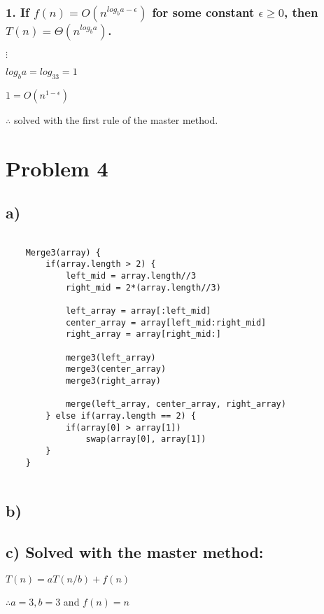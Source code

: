\documentclass{article}
\begin{document}
\subsubsection*{1. If $f(n) = O(n^{log_ba - \epsilon})$ for some constant $\epsilon \geq  0$, then $T(n) = \Theta(n^{log_ba})$.}

$\vdots$

$log_ba = log_33 = 1$

$1 = O(n^{1 - \epsilon})$

$\therefore$  solved with the first rule of the master method.

\section*{Problem 4}

\subsection*{a)}

\begin{verbatim}
    
    Merge3(array) {
        if(array.length > 2) {
            left_mid = array.length//3
            right_mid = 2*(array.length//3)
            
            left_array = array[:left_mid]
            center_array = array[left_mid:right_mid]
            right_array = array[right_mid:]
            
            merge3(left_array)
            merge3(center_array)
            merge3(right_array)
            
            merge(left_array, center_array, right_array)
        } else if(array.length == 2) {
            if(array[0] > array[1]) 
                swap(array[0], array[1])
        }
    }
    
\end{verbatim}

\subsection*{b) }

\subsection*{c) Solved with the master method:}

$T(n) = aT(n/b) + f(n)$

$\therefore a = 3, b = 3$ and $f(n) = n$
\end{document}
